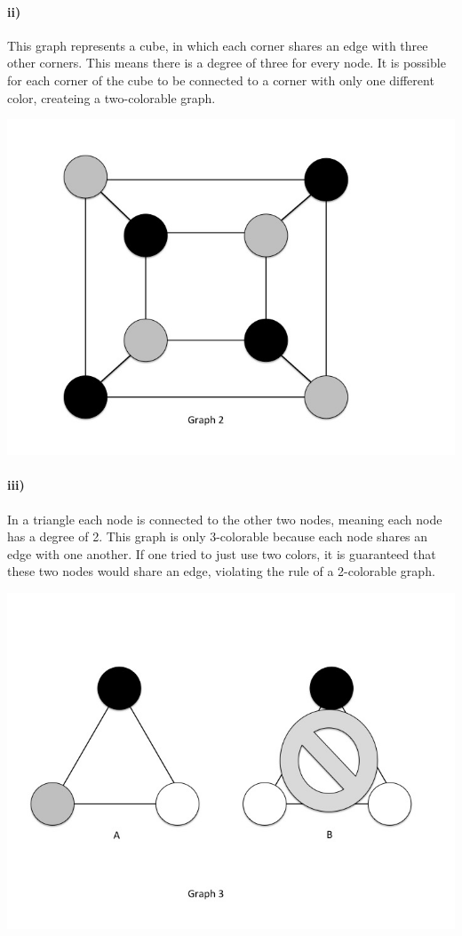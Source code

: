 \documentclass[10pt,letter]{article}
\begin{document}
\paragraph{ii)}
This graph represents a cube, in which each corner shares an edge with three other corners. This means there is a degree of three for every node. It is possible for each corner of the cube to be connected to a corner with only one different color, createing a two-colorable graph. \\
\begin{minipage}{.8\textwidth}
\includegraphics[width=.8\linewidth]{hw3_slide2.jpg}
\end{minipage}

\paragraph{iii)}
In a triangle each node is connected to the other two nodes, meaning each node has a degree of 2. This graph is only 3-colorable because each node shares an edge with one another. If one tried to just use two colors, it is guaranteed that these two nodes would share an edge, violating the rule of a 2-colorable graph.  
\begin{minipage}{.8\textwidth}
\includegraphics[width=.8\linewidth]{hw3_slide3.jpg}
\end{minipage}
\end{document}
